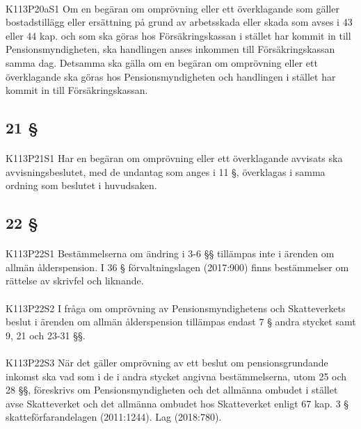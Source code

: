 \documentclass[a4paper,notitlepage,openany,10pt]{book}
\begin{document}
\paragraph*{}
{\tiny K113P20aS1}
Om en begäran om omprövning eller ett överklagande som gäller bostadstillägg eller ersättning på grund av arbetsskada eller skada som avses i 43 eller 44 kap. och som ska göras hos Försäkringskassan i stället har kommit in till Pensionsmyndigheten, ska handlingen anses inkommen till Försäkringskassan samma dag. Detsamma ska gälla om en begäran om omprövning eller ett överklagande ska göras hos Pensionsmyndigheten och handlingen i stället har kommit in till Försäkringskassan.
\subsection*{21 §}
\paragraph*{}
{\tiny K113P21S1}
Har en begäran om omprövning eller ett överklagande avvisats ska avvisningsbeslutet, med de undantag som anges i 11 §, överklagas i samma ordning som beslutet i huvudsaken.
\subsection*{22 §}
\paragraph*{}
{\tiny K113P22S1}
Bestämmelserna om ändring i 3-6 §§ tillämpas inte i ärenden om allmän ålderspension. I 36 § förvaltningslagen (2017:900) finns bestämmelser om rättelse av skrivfel och liknande.
\paragraph*{}
{\tiny K113P22S2}
I fråga om omprövning av Pensionsmyndighetens och Skatteverkets beslut i ärenden om allmän ålderspension tillämpas endast 7 § andra stycket samt 9, 21 och 23-31 §§.
\paragraph*{}
{\tiny K113P22S3}
När det gäller omprövning av ett beslut om pensionsgrundande inkomst ska vad som i de i andra stycket angivna bestämmelserna, utom 25 och 28 §§, föreskrivs om Pensionsmyndigheten och det allmänna ombudet i stället avse Skatteverket och det allmänna ombudet hos Skatteverket enligt 67 kap. 3 § skatteförfarandelagen (2011:1244).
Lag (2018:780).
\end{document}
